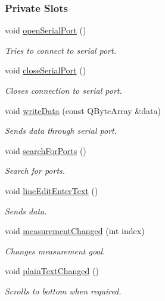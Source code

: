 \subsubsection*{Private Slots}
\begin{DoxyCompactItemize}
\item 
void \hyperlink{classMainWindow_a22d5b63d63ca5fc1fb9a7ef40efc38c8}{open\+Serial\+Port} ()
\begin{DoxyCompactList}\small\item\em Tries to connect to serial port. \end{DoxyCompactList}\item 
void \hyperlink{classMainWindow_ac5eae1a5faf30bb616185aa3be724484}{close\+Serial\+Port} ()
\begin{DoxyCompactList}\small\item\em Closes connection to serial port. \end{DoxyCompactList}\item 
void \hyperlink{classMainWindow_a76237574ac5c68506bcb9b9de468fda2}{write\+Data} (const Q\+Byte\+Array \&data)
\begin{DoxyCompactList}\small\item\em Sends data through serial port. \end{DoxyCompactList}\item 
void \hyperlink{classMainWindow_a5afc1f8c3bbce5e91e4cebf2dd4e6069}{search\+For\+Ports} ()
\begin{DoxyCompactList}\small\item\em Search for ports. \end{DoxyCompactList}\item 
void \hyperlink{classMainWindow_ad7ece63fdbb09608a22fc0631143b6ec}{line\+Edit\+Enter\+Text} ()
\begin{DoxyCompactList}\small\item\em Sends data. \end{DoxyCompactList}\item 
void \hyperlink{classMainWindow_ad3fa656a0c81fa2ec687b02bd0f9658b}{measurement\+Changed} (int index)
\begin{DoxyCompactList}\small\item\em Changes measurement goal. \end{DoxyCompactList}\item 
void \hyperlink{classMainWindow_a89b2e9afba74a68fd3b4a28d4475cec7}{plain\+Text\+Changed} ()
\begin{DoxyCompactList}\small\item\em Scrolls to bottom when required. \end{DoxyCompactList}\item 

\end{DoxyCompactItemize}
